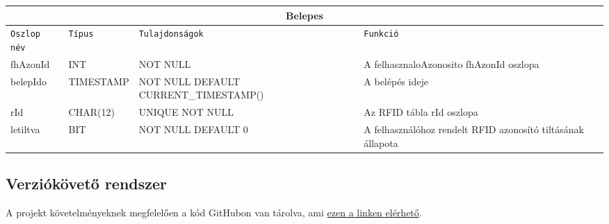\documentclass[11pt, a4paper]{article}
\begin{document}
				\begin{minipage}{\linewidth}
					\fontsize{10}{16}\selectfont
					\centering
					\begin{tabular}{||m{6em} m{6em} m{12.5em} m{12em}||}
						\hline
						\multicolumn{4}{|c|}{\textbf{Belepes}} \\
						\hline
						\texttt{Oszlop név} & \texttt{Típus} & \texttt{Tulajdonságok} & \texttt{Funkció} \\
						\hline\hline
						fhAzonId & INT & NOT NULL & A felhasznaloAzonosito fhAzonId oszlopa \\ 
						\hline
						belepIdo & TIMESTAMP & NOT NULL\newline{} DEFAULT CURRENT\_TIMESTAMP() & A belépés ideje \\ 
						\hline
						rId & CHAR(12) & UNIQUE NOT NULL & Az RFID tábla rId oszlopa \\ 
						\hline
						letiltva & BIT & NOT NULL DEFAULT 0 & A felhasználóhoz rendelt RFID azonosító tiltásának állapota \\
						\hline
					\end{tabular}
					\label{table:4}
				\end{minipage}
			
		\subsection{Verziókövető rendszer}
			\begin{flushleft}
				\justifying
				A projekt követelményeknek megfelelően a kód GitHubon van tárolva, ami
				 \color{blue}
				 \href{https://github.com/mark182182/GKLB_INTM020_mikroelektromechanikai_rendszerek}{ezen a linken elérhető}\color{black}.
			\end{flushleft}
			
\end{document}
